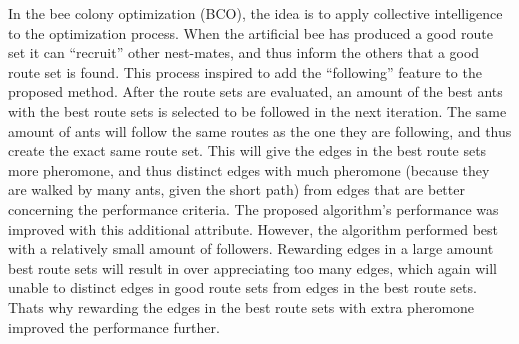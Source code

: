In the bee colony optimization (BCO), the idea is to apply collective intelligence to the optimization process. When the artificial bee has produced a good route set it can ``recruit'' other nest-mates, and thus inform the others that a good route set is found. This process inspired to add the ``following'' feature to the proposed method. After the route sets are evaluated, an amount of the best ants with the best route sets is selected to be followed in the next iteration. The same amount of ants will follow the same routes as the one they are following, and thus create the exact same route set. This will give the edges in the best route sets more pheromone, and thus distinct edges with much pheromone (because they are walked by many ants, given the short path) from edges that are better concerning the performance criteria. The proposed algorithm's performance was improved with this additional attribute. However, the algorithm performed best with a relatively small amount of followers. Rewarding edges in a large amount best route sets will result in over appreciating too many edges, which again will unable to distinct edges in good route sets from edges in the best route sets. Thats why rewarding the edges in the best route sets with extra pheromone improved the performance further.  %


